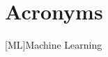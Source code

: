 
\chapter{Acronyms} \label{chap: Acronyms}

\begin{acronym}[AAAAA]
    [ML]{Machine Learning}
\end{acronym}
